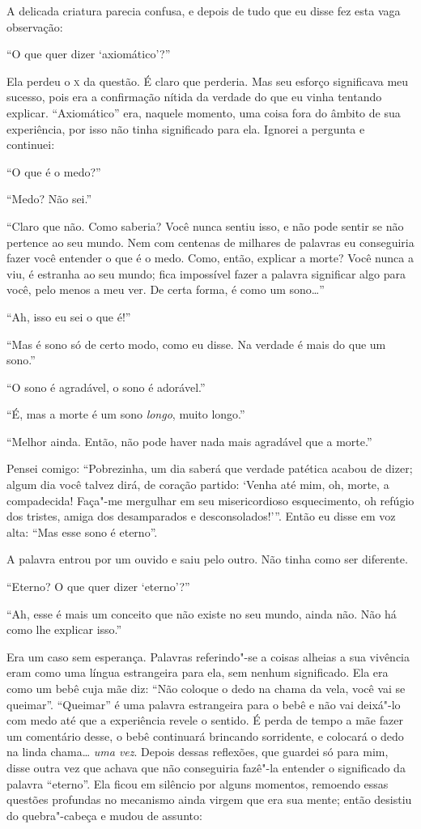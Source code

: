 A delicada criatura parecia confusa, e depois de tudo que eu disse fez esta
vaga observação:

“O que quer dizer ‘axiomático’?”

Ela perdeu o \textsc{x} da questão. É claro que perderia. Mas seu esforço
significava meu sucesso, pois era a confirmação nítida da verdade do que
eu vinha tentando explicar. ``Axiomático'' era, naquele momento, uma coisa
fora do âmbito de sua experiência, por isso não tinha significado para ela.
Ignorei a pergunta e continuei:

“O que é o medo?”

“Medo? Não sei.”

``Claro que não. Como saberia? Você nunca
sentiu isso, e não pode sentir se não pertence ao seu mundo. Nem com
centenas de milhares de palavras eu conseguiria fazer você entender o que é o
medo. Como, então, explicar a morte? Você nunca a viu, é
estranha ao seu mundo; fica impossível fazer a palavra significar algo
para você, pelo menos a meu ver. De certa forma, é como um
sono\ldots{}''

``Ah, isso eu sei o que é!''

``Mas é sono só de certo modo, como eu disse. Na verdade é mais
do que um sono.''

``O sono é agradável, o sono é adorável.''

``É, mas a morte é um sono \textit{longo}, muito longo.''

``Melhor ainda. Então, não pode haver nada mais agradável que a morte.''

Pensei comigo: ``Pobrezinha, um dia saberá que
verdade patética acabou de dizer; algum dia você talvez dirá, de coração
partido: `Venha até mim, oh, morte, a
compadecida! Faça"-me mergulhar em seu misericordioso
esquecimento, oh refúgio dos tristes, amiga dos desamparados e
desconsolados!'”. Então eu disse em voz alta:
``Mas esse sono é eterno''.

A palavra entrou por um ouvido e saiu pelo outro. Não tinha como ser diferente.

``Eterno? O que quer dizer ‘eterno’?''

``Ah, esse é mais um conceito que não existe no seu mundo,
ainda não. Não há como lhe explicar isso.''

Era um caso sem esperança. Palavras referindo"-se a coisas alheias a sua
vivência eram como uma língua estrangeira para ela, sem nenhum significado. 
Ela era como um bebê cuja mãe diz: ``Não coloque o
dedo na chama da vela, você vai se queimar''. “Queimar” é uma
palavra estrangeira para o bebê e não vai deixá"-lo com medo até que a
experiência revele o sentido. É perda de tempo a mãe fazer um
comentário desse, o bebê continuará brincando sorridente, e colocará o dedo na
linda chama\ldots{} \textit{uma vez}. Depois dessas
reflexões, que guardei só para mim,  disse outra vez que
achava que não conseguiria fazê"-la entender o significado da palavra
“eterno”. Ela ficou em silêncio por alguns momentos, remoendo essas
questões profundas no mecanismo ainda virgem que era sua mente; então desistiu do
quebra"-cabeça e mudou de assunto:

